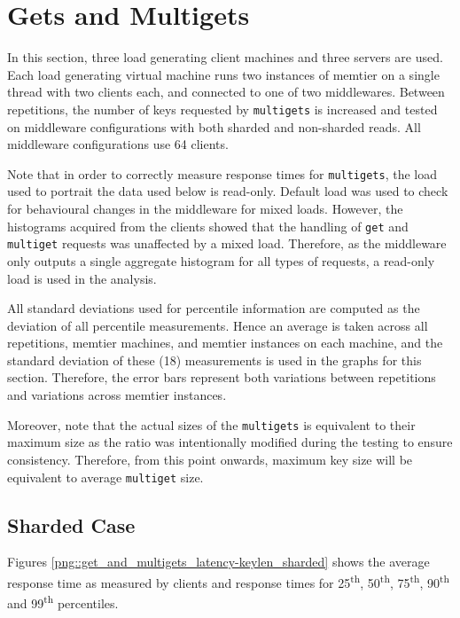 \documentclass[11pt,a4paper]{article}
\begin{document}
\newpage

\section{Gets and Multigets}
In this section, three load generating client machines and three servers are used. Each load generating virtual machine runs two instances of memtier on a single thread with two clients each, and connected to one of two middlewares. Between repetitions, the number of keys requested by \texttt{multigets} is increased and tested on middleware configurations with both sharded and non-sharded reads. All middleware configurations use 64 clients.

Note that in order to correctly measure response times for \texttt{multigets}, the load used to portrait the data used below is read-only. Default load was used to check for behavioural changes in the middleware for mixed loads. However, the histograms acquired from the clients showed that the handling of \texttt{get} and \texttt{multiget} requests was unaffected by a mixed load. Therefore, as the middleware only outputs a single aggregate histogram for all types of requests, a read-only load is used in the analysis.

All standard deviations used for percentile information are computed as the deviation of all percentile measurements. Hence an average is taken across all repetitions, memtier machines, and memtier instances on each machine, and the standard deviation of these (18) measurements is used in the graphs for this section. Therefore, the error bars represent both variations between repetitions and variations across memtier instances.

Moreover, note that the actual sizes of the \texttt{multigets} is equivalent to their maximum size as the ratio was intentionally modified during the testing to ensure consistency. Therefore, from this point onwards, maximum key size will be equivalent to average \texttt{multiget} size.

\subsection{Sharded Case}
Figures \ref{png::get_and_multigets_latency-keylen_sharded} shows the average response time as measured by clients and response times for 25\textsuperscript{th}, 50\textsuperscript{th}, 75\textsuperscript{th}, 90\textsuperscript{th} and 99\textsuperscript{th} percentiles.
\end{document}
